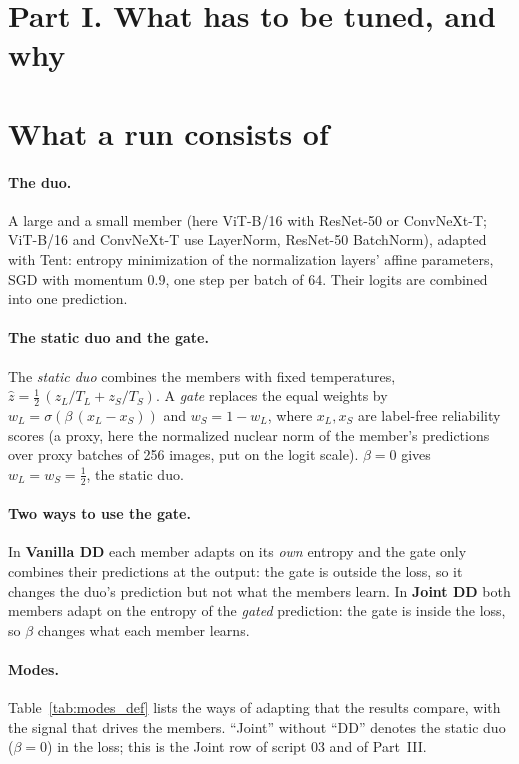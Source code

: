 \documentclass[10pt]{article}
\newcommand{\vit}{ViT-B/16}
\newcommand{\cnx}{ConvNeXt-T}
\newcommand{\rn}{ResNet-50}
\begin{document}
\section*{Part I. What has to be tuned, and why}

\section{What a run consists of}\label{sec:parts}
\paragraph{The duo.} A large and a small member (here \vit{} with \rn{} or \cnx{}; \vit{} and \cnx{} use LayerNorm, \rn{} BatchNorm), adapted with Tent: entropy minimization of the normalization layers' affine parameters, SGD with momentum 0.9, one step per batch of 64. Their logits are combined into one prediction.

\paragraph{The static duo and the gate.} The \emph{static duo} combines the members with fixed temperatures, \(\hat z = \tfrac12\,(z_L/T_L + z_S/T_S)\). A \emph{gate} replaces the equal weights by \(w_L = \sigma(\beta\,(x_L - x_S))\) and \(w_S = 1-w_L\), where \(x_L, x_S\) are label-free reliability scores (a proxy, here the normalized nuclear norm of the member's predictions over proxy batches of 256 images, put on the logit scale). \(\beta = 0\) gives \(w_L = w_S = \tfrac12\), the static duo.

\paragraph{Two ways to use the gate.} In \textbf{Vanilla DD} each member adapts on its \emph{own} entropy and the gate only combines their predictions at the output: the gate is outside the loss, so it changes the duo's prediction but not what the members learn. In \textbf{Joint DD} both members adapt on the entropy of the \emph{gated} prediction: the gate is inside the loss, so \(\beta\) changes what each member learns.

\paragraph{Modes.} Table~\ref{tab:modes_def} lists the ways of adapting that the results compare, with the signal that drives the members. ``Joint'' without ``DD'' denotes the static duo (\(\beta=0\)) in the loss; this is the Joint row of script 03 and of Part~III.
\end{document}
